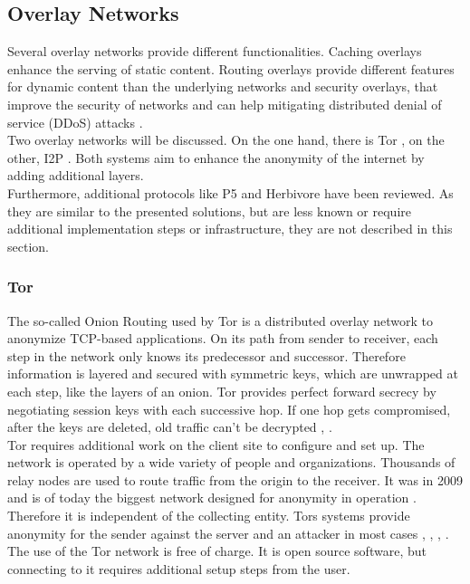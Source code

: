     \subsection{Overlay Networks}
        \label{subsec:related:overlay}
        Several overlay networks provide different functionalities. Caching overlays enhance the serving of static content. Routing overlays provide different features for dynamic content than the underlying networks and security overlays, that improve the security of networks and can help mitigating distributed denial of service (DDoS) attacks \cite{pathan_overlay_2014}.\\
        Two overlay networks will be discussed. On the one hand, there is Tor \cite{dingledine_tor_2004}, on the other, I2P \cite{zantout_i2p_2011}. Both systems aim to enhance the anonymity of the internet by adding additional layers.\\
        Furthermore, additional protocols like P5 \cite{sherwood_p_2005} and Herbivore \cite{goel_herbivore_2003} have been reviewed. As they are similar to the presented solutions, but are less known or require additional implementation steps or infrastructure, they are not described in this section.
     
     
    \subsubsection{Tor}
        The so-called Onion Routing used  by Tor is a distributed overlay network to anonymize TCP-based applications. On its path from sender to receiver, each step in the network only knows its predecessor and successor. Therefore information is layered and secured with symmetric keys, which are unwrapped at each step, like the layers of an onion.
        Tor provides perfect forward secrecy by negotiating session keys with each successive hop. If one hop gets compromised, after the keys are deleted, old traffic can't be decrypted \cite{dingledine_tor_2004}, \cite{borisov_shining_2008}.\\
        Tor requires additional work on the client site to configure and set up. 
        The network is operated by a wide variety of people and organizations.
        Thousands of relay nodes are used to route traffic from the origin to the receiver. It was in 2009 and is of today the biggest network designed for anonymity in operation \cite{edman_anonymity_2009}.
        Therefore it is independent of the collecting entity. Tors systems provide anonymity for the sender against the server and an attacker in most cases \cite{arma_one_2009},  \cite{poulsen_feds_2013}, \cite{samson_tor_2013}, \cite{herrmann_website_2009}.\\
        The use of the Tor network is free of charge. It is open source software, but connecting to it requires additional setup steps from the user.\\
    
